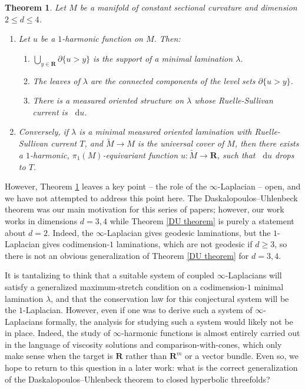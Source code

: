 \documentclass[reqno,11pt]{amsart}
\newcommand{\RR}{\mathbf{R}}
\newcommand*\dif{\mathop{}\!\mathrm{d}}
\newtheorem{theorem}{Theorem}[section]
\theoremstyle{definition}
\numberwithin{equation}{section}
\begin{document}
\begin{theorem}\label{main thm}
Let $M$ be a manifold of constant sectional curvature and dimension $2 \leq d \leq 4$.
\begin{enumerate}
\item Let $u$ be a $1$-harmonic function on $M$.
Then:
\begin{enumerate}
\item $\bigcup_{y \in \RR} \partial \{u > y\}$ is the support of a minimal lamination $\lambda$.
\item The leaves of $\lambda$ are the connected components of the level sets $\partial \{u > y\}$.
\item There is a measured oriented structure on $\lambda$ whose Ruelle-Sullivan current is $\dif u$.
\end{enumerate}
\item Conversely, if $\lambda$ is a minimal measured oriented lamination with Ruelle-Sullivan current $T$, and $\tilde M \to M$ is the universal cover of $M$, then there exists a $1$-harmonic, $\pi_1(M)$-equivariant function $u: \tilde M \to \RR$, such that $\dif u$ drops to $T$.
\end{enumerate}
\end{theorem}

However, Theorem \ref{main thm} leaves a key point -- the role of the $\infty$-Laplacian -- open, and we have not attempted to address this point here.
The Daskalopoulos--Uhlenbeck theorem was our main motivation for this series of papers; however, our work works in dimensions $d = 3, 4$ while Theorem \ref{DU theorem} is purely a statement about $d = 2$.
Indeed, the $\infty$-Laplacian gives geodesic laminations, but the $1$-Laplacian gives codimension-$1$ laminations, which are not geodesic if $d \geq 3$, so there is not an obvious generalization of Theorem \ref{DU theorem} for $d = 3, 4$.

It is tantalizing to think that a suitable system of coupled $\infty$-Laplacians will satisfy a generalized maximum-stretch condition on a codimension-$1$ minimal lamination $\lambda$, and that the conservation law for this conjectural system will be the $1$-Laplacian.
However, even if one was to derive such a system of $\infty$-Laplacians formally, the analysis for studying such a system would likely not be in place.
Indeed, the study of $\infty$-harmonic functions is almost entirely carried out in the language of viscosity solutions and comparison-with-cones, which only make sense when the target is $\RR$ rather than $\RR^m$ or a vector bundle.
Even so, we hope to return to this question in a later work: what is the correct generalization of the Daskalopoulos--Uhlenbeck theorem to closed hyperbolic threefolds?
\end{document}
